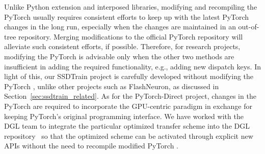 Unlike Python extension  and interposed libraries, modifying and recompiling the PyTorch  usually requires consistent efforts to keep up with the latest PyTorch changes in the long run, especially when the changes are maintained in an out-of-tree repository. Merging modifications to the official PyTorch repository will alleviate such consistent efforts, if possible. Therefore, for research projects, modifying the PyTorch  is advisable only when the other two methods are insufficient in adding the required functionality, e.g., adding new dispatch keys. 
In light of this, our SSDTrain project is carefully developed without modifying the PyTorch , unlike other projects such as FlashNeuron, as discussed in Section~\ref{sec:ssdtrain_related}.
As for the PyTorch-Direct project, changes in the PyTorch  are required to incorporate the GPU-centric paradigm in exchange for keeping PyTorch's original programming interface. We have worked with the DGL team to integrate the particular optimized transfer scheme into the DGL repository~\cite{minjiewangReleaseV080Dmlc2022,seungwonminDocAddOfficial2021,seungwonminFeatureAddMultiGPU2021,seungwonminFeaturePerformanceGPUIntroducingUnifiedTensor2021,xinyaoDglDGLGraphpin_memory_2022} so that the optimized scheme can be activated through explicit new APIs without the need to recompile modified PyTorch .



